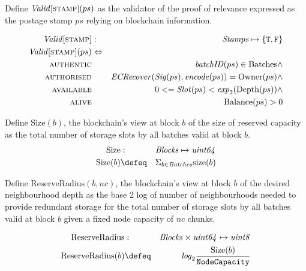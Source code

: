 \begin{definition}
\label{def:postage-stamp-validity}
Define $\mathit{Valid}[\textsc{\lowercase{STAMP}}](ps)$ as the validator of the proof of relevance expressed as the postage stamp $ps$ relying on blockchain information.

\begin{eqnarray}
\mathit{Valid}[\textsc{\lowercase{STAMP}}] &:& \mathit{Stamps} \mapsto \{\mathtt{T,F}\}\\
\mathit{Valid}[\textsc{\lowercase{STAMP}}](ps) &\Leftrightarrow& \\
\textsc{authentic} & & \mathit{batchID}(ps)\in\mathrm{Batches}\wedge
\\
\textsc{authorised} & &  \mathit{ECRecover}(\mathit{Sig}(ps), \mathit{encode}(ps)) = \mathrm{Owner}(ps) \wedge
\\
\textsc{available} & & 0 <= \mathit{Slot}(ps) < \mathit{exp}_2({\mathrm{Depth}(ps)})\wedge
\\
\textsc{alive} & & \mathrm{Balance}(ps) > 0
\end{eqnarray}
\end{definition}


\begin{definition}
Define $\mathrm{Size}(b)$, the blockchain's view at block $b$ of the size of reserved capacity as the total number of storage slots by all batches valid at block $b$.
\begin{eqnarray}
\mathrm{Size}&:&\mathit{Blocks}\mapsto \mathit{uint64}\\
\mathrm{Size}(b)&\defeq&\Sigma_{b\in \mathit{Batches}}\mathrm{size}(b)
\end{eqnarray}
\end{definition}


\begin{definition}
Define $\mathrm{ReserveRadius}(b, nc)$, the blockchain's view at block $b$ of the desired neighbourhood depth as the base 2 log of number of neighbourhoods needed to provide redundant storage for the total number of storage slots by all batches valid at block $b$ given a fixed node capacity of $nc$ chunks.

\begin{eqnarray}
\mathrm{ReserveRadius}&:&\mathit{Blocks}\times\mathit{uint64}\mapsto \mathit{uint8}\\
\mathrm{ReserveRadius}(b)&\defeq&\mathit{log}_2\frac{\mathrm{Size}(b)}{\texttt{NodeCapacity}}
\end{eqnarray}
\end{definition}



